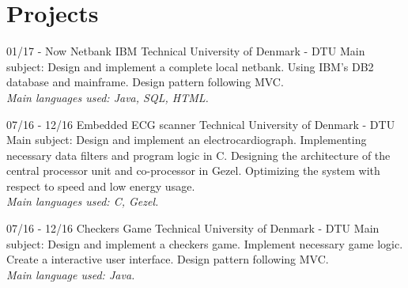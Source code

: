 \documentclass[]{friggeri-cv}
\begin{document}
\section{Projects}
\begin{entrylist}
  \entry
    {01/17 - Now}
    {Netbank IBM}
    {Technical University of Denmark - DTU}
    {Main subject: Design and implement a complete local netbank. Using IBM's DB2 database and mainframe. Design pattern following MVC.\\
    \emph{Main languages used: Java, SQL, HTML.}
    \\}
    
  \entry
    {07/16 - 12/16}
    {Embedded ECG scanner}
    {Technical University of Denmark - DTU}
    {Main subject: Design and implement an electrocardiograph. Implementing necessary data filters and program logic in C. Designing the architecture of the central processor unit and co-processor in Gezel. Optimizing the system with respect to speed and low energy usage.\\
    \emph{Main languages used: C, Gezel.}
    \\}
    
  \entry
    {07/16 - 12/16}
    {Checkers Game}
    {Technical University of Denmark - DTU}
    {Main subject: Design and implement a checkers game. Implement necessary game logic. Create a interactive user interface. Design pattern following MVC. \\
    \emph{Main language used: Java.}}
\end{entrylist}
\end{document}
